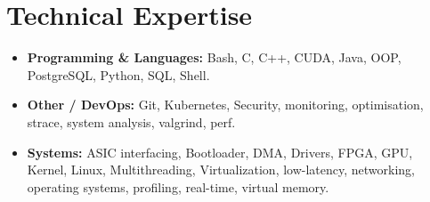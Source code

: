 \documentclass[9pt,a4paper]{article}
\begin{document}
\section*{Technical Expertise}
\begin{tcolorbox}[mybox]
\begin{itemize}
\item \textbf{Programming \& Languages:} Bash, C, C++, CUDA, Java, OOP, PostgreSQL, Python, SQL, Shell.

\item \textbf{Other / DevOps:} Git, Kubernetes, Security, monitoring, optimisation, strace, system analysis, valgrind, perf.

\item \textbf{Systems:} ASIC interfacing, Bootloader, DMA, Drivers, FPGA, GPU, Kernel, Linux, Multithreading, Virtualization, low-latency, networking, operating systems, profiling, real-time, virtual memory.
\end{itemize}
\end{tcolorbox}
\end{document}
